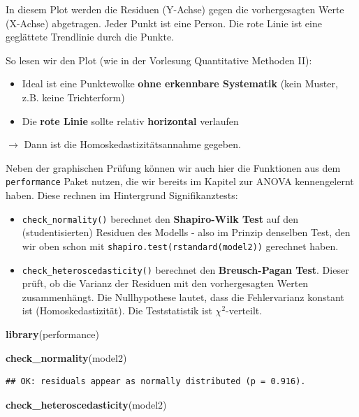 \documentclass[
]{book}
\newenvironment{Shaded}{\begin{snugshade}}{\end{snugshade}}
\newcommand{\FunctionTok}[1]{\textcolor[rgb]{0.13,0.29,0.53}{\textbf{#1}}}
\newcommand{\NormalTok}[1]{#1}
\providecommand{\tightlist}{%
  \setlength{\itemsep}{0pt}\setlength{\parskip}{0pt}}
\begin{document}
In diesem Plot werden die Residuen (Y-Achse) gegen die vorhergesagten Werte (X-Achse) abgetragen. Jeder Punkt ist eine Person. Die rote Linie ist eine geglättete Trendlinie durch die Punkte.

So lesen wir den Plot (wie in der Vorlesung Quantitative Methoden II):

\begin{itemize}
\tightlist
\item
  Ideal ist eine Punktewolke \textbf{ohne erkennbare Systematik} (kein Muster, z.B. keine Trichterform)
\item
  Die \textbf{rote Linie} sollte relativ \textbf{horizontal} verlaufen
\end{itemize}

\(\rightarrow\) Dann ist die Homoskedastizitätsannahme gegeben.

Neben der graphischen Prüfung können wir auch hier die Funktionen aus dem \texttt{performance} Paket nutzen, die wir bereits im Kapitel zur ANOVA kennengelernt haben. Diese rechnen im Hintergrund Signifikanztests:

\begin{itemize}
\tightlist
\item
  \texttt{check\_normality()} berechnet den \textbf{Shapiro-Wilk Test} auf den (studentisierten) Residuen des Modells - also im Prinzip denselben Test, den wir oben schon mit \texttt{shapiro.test(rstandard(model2))} gerechnet haben.
\item
  \texttt{check\_heteroscedasticity()} berechnet den \textbf{Breusch-Pagan Test}. Dieser prüft, ob die Varianz der Residuen mit den vorhergesagten Werten zusammenhängt. Die Nullhypothese lautet, dass die Fehlervarianz konstant ist (Homoskedastizität). Die Teststatistik ist \(\chi^2\)-verteilt.
\end{itemize}

\begin{Shaded}
\begin{Highlighting}[]
\FunctionTok{library}\NormalTok{(performance)}

\FunctionTok{check\_normality}\NormalTok{(model2)}
\end{Highlighting}
\end{Shaded}

\begin{verbatim}
## OK: residuals appear as normally distributed (p = 0.916).
\end{verbatim}

\begin{Shaded}
\begin{Highlighting}[]
\FunctionTok{check\_heteroscedasticity}\NormalTok{(model2)}
\end{Highlighting}
\end{Shaded}
\end{document}
